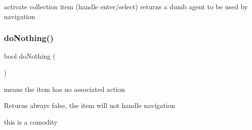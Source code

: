 activate collection item (handle enter/select) returns a dumb agent to be used by navigation \mbox{\label{group__Agents_ga34d052b903454a7ceda33b9506513683}} 
\subsubsection{\texorpdfstring{do\+Nothing()}{doNothing()}}
{\footnotesize\ttfamily bool do\+Nothing (\begin{DoxyParamCaption}{ }\end{DoxyParamCaption})\hspace{0.3cm}{\ttfamily [inline]}}



means the item has no associated action 

\begin{DoxyReturn}{Returns}
always false, the item will not handle navigation
\end{DoxyReturn}
this is a comodity 